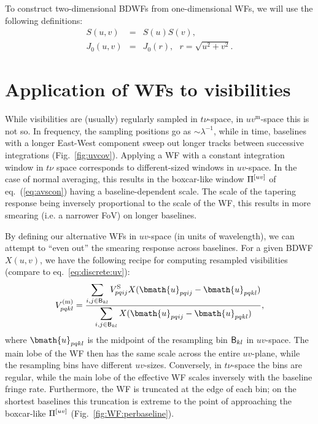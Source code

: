 \documentclass[useAMS,usenatbib]{mn2e}
\newcommand{\OMS}[1]{\textcolor{red}{{\bf OMS: #1}}}
\begin{document}
To construct two-dimensional BDWFs from one-dimensional WFs, we will use the following definitions:
\begin{eqnarray}
S(u,v) &=& S(u)S(v), \nonumber\\
J_0(u,v) &=& J_0(r), ~~~r=\sqrt{u^2+v^2}.\nonumber
\end{eqnarray}

\section{Application of WFs to visibilities}

While visibilities are (usually) regularly sampled in $t\nu$-space, in $uv^\mathrm{m}$-space this is not so. In frequency, 
the sampling positions go as $\sim\lambda^{-1}$, while in time, baselines with a longer East-West component sweep out longer tracks between successive 
integrations (Fig.~\ref{fig:uvcov}). Applying a WF with a constant integration window in $t\nu$ space corresponds to 
different-sized windows in $uv$-space. In the case of normal averaging, this results in the boxcar-like window $\Pi^{[uv]}$ of 
eq.~(\ref{eq:avscon}) having a baseline-dependent scale. The scale of the tapering response being inversely proportional to 
the scale of the WF, this results in more smearing (i.e. a narrower FoV) on longer baselines.

By defining our alternative WFs in $uv$-space (in units of wavelength), we can attempt to ``even out'' the smearing 
response across baselines. For a given BDWF $X(u,v)$, we have the following recipe 
for computing resampled visibilities (compare to eq.~\ref{eq:discrete:uv}):
\begin{equation}
\label{eq:avg:wf}
V^\mathrm{(m)}_{pqkl} = \frac{\displaystyle\sum\limits_{{i,j}\in \Bij_{kl}} \Vs_{pqij} X(\bmath{u}_{pqij}-\bmath{u}_{pqkl})}
{\displaystyle\sum\limits_{{i,j}\in \Bij_{kl}} X(\bmath{u}_{pqij}-\bmath{u}_{pqkl})},
\end{equation}
where $\bmath{u}_{pqkl}$ is the midpoint of the resampling bin $\mathsf{B}_{kl}$ in $uv$-space. The main lobe of the WF then 
has the same scale across the entire $uv$-plane, while the resampling bins have different $uv$-sizes. Conversely, in 
$t\nu$-space the bins
are regular, while the main lobe of the effective WF scales inversely with the baseline fringe rate. Furthermore, 
the WF is truncated at the edge of each bin; on the shortest baselines this truncation is extreme to the 
point of approaching the boxcar-like $\Pi^{[uv]}$ (Fig.~\ref{fig:WF:perbaseline}).
\end{document}
